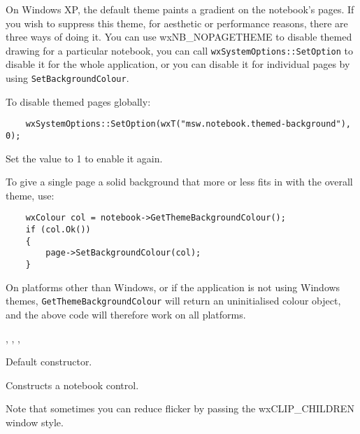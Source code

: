 
On Windows XP, the default theme paints a gradient on the notebook's pages.
If you wish to suppress this theme, for aesthetic or performance reasons,
there are three ways of doing it. You can use wxNB\_NOPAGETHEME to disable
themed drawing for a particular notebook, you can call {\tt wxSystemOptions::SetOption} 
to disable it for the whole application, or you can disable it for individual
pages by using {\tt SetBackgroundColour}.

To disable themed pages globally:

\begin{verbatim}
    wxSystemOptions::SetOption(wxT("msw.notebook.themed-background"), 0);
\end{verbatim}

Set the value to 1 to enable it again.

To give a single page a solid background that more or less fits in with the
overall theme, use:

\begin{verbatim}
    wxColour col = notebook->GetThemeBackgroundColour();
    if (col.Ok())
    {
        page->SetBackgroundColour(col);
    }
\end{verbatim}

On platforms other than Windows, or if the application is not using Windows
themes, {\tt GetThemeBackgroundColour} will return an uninitialised colour object,
and the above code will therefore work on all platforms.


, , , \rtfsp


\label{wxnotebookctor}


Default constructor.


Constructs a notebook control.

Note that sometimes you can reduce flicker by passing the wxCLIP\_CHILDREN window style.

